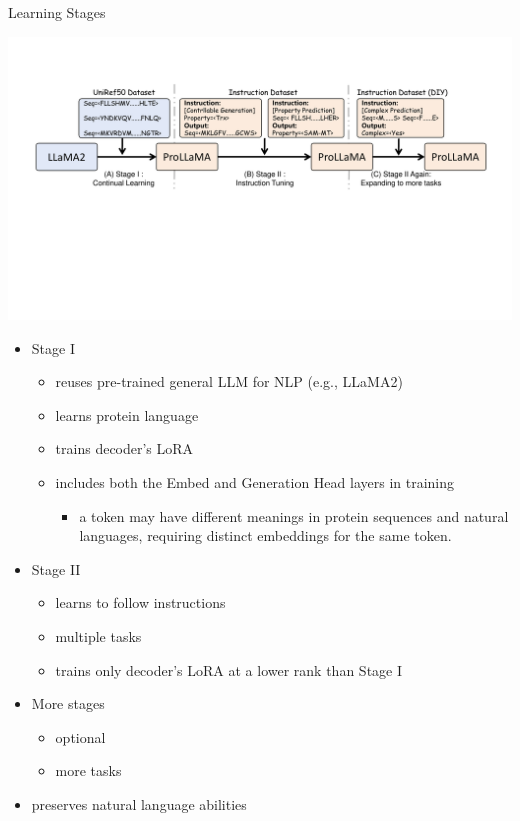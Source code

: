 \begin{frame}[shrink=30]{Learning Stages}
	\begin{center}
		\includegraphics[scale=0.5]{images/training.pdf}
	\end{center}
	\begin{itemize}
		\item Stage I
		\begin{itemize}
			\item reuses pre-trained general LLM for NLP (e.g., LLaMA2)
			\item learns protein language
			\item trains decoder's LoRA
			\item includes both the Embed and Generation Head layers in training
			\begin{itemize}
				\item a token may have different meanings in protein
				sequences and natural languages, requiring distinct embeddings for the same token.
			\end{itemize}
		\end{itemize}
		\item Stage II
		\begin{itemize}
			\item learns to follow instructions
			\item multiple tasks
			\item trains only decoder's LoRA at a lower rank than Stage I
		\end{itemize}
		\item More stages
		\begin{itemize}
			\item optional
			\item more tasks
		\end{itemize}
		\item preserves natural language abilities
	\end{itemize}
\end{frame}
